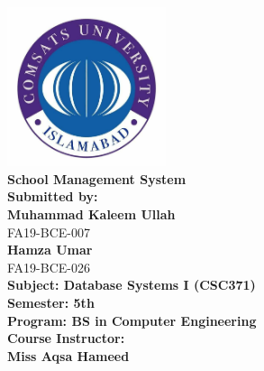 
\begin{titlepage}
\begin{center}


\includegraphics[width=0.35\textwidth]{./logo}~\\[1.5cm]


{ \huge \bfseries School Management System} \\[1.4cm]

{ \large \bfseries Submitted by:} \\[0.2cm]

{ \large \bfseries Muhammad Kaleem Ullah}  \\[0.1cm]
{ \small FA19-BCE-007} \\[0.2cm]
{ \large \bfseries Hamza Umar}  \\[0.1cm]
{ \small FA19-BCE-026} \\[0.6cm]



{ \small \bfseries Subject: Database Systems I (CSC371)} \\[0.2cm]
{ \small \bfseries Semester: 5th} \\[0.2cm]
{ \small \bfseries Program: BS in Computer Engineering} \\[0.6cm]


{ \large \bfseries Course Instructor:} \\[0.1cm]
{ \small \bfseries Miss Aqsa Hameed} \\[0.2cm]



\end{center}
\end{titlepage}
